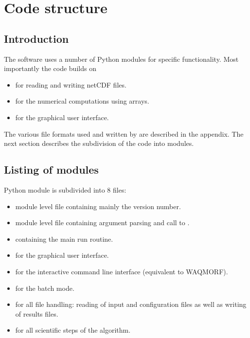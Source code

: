 \chapter{Code structure}


\section{Introduction}

The software uses a number of Python modules for specific functionality.
Most importantly the code builds on

\begin{itemize}
\item {} for reading and writing netCDF files.
\item {} for the numerical computations using arrays.
\item {} for the graphical user interface.
\end{itemize}

The various file formats used and written by \dfastmi are described in the appendix.
The next section describes the subdivision of the code into modules.

\section{Listing of modules}

\dfastmi Python module is subdivided into 8 files:

\begin{itemize}
\item {} module level file containing mainly the version number.
\item {} module level file containing argument parsing and call to .
\item {} containing the main run routine.
\item {} for the graphical user interface.
\item {} for the interactive command line interface (equivalent to WAQMORF).
\item {} for the batch mode.
\item {} for all file handling: reading of input and configuration files as well as writing of results files.
\item {} for all scientific steps of the algorithm.
\end{itemize}

